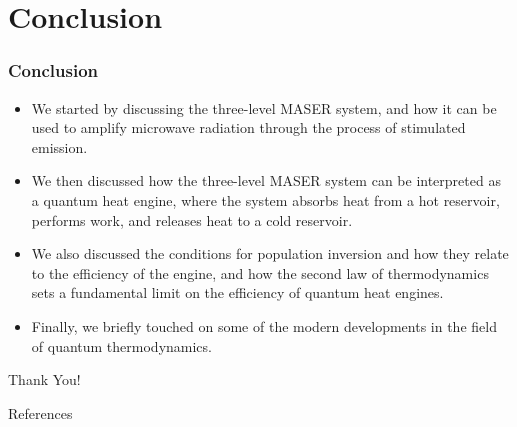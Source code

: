 \documentclass{beamer}
\begin{document}
    \section{Conclusion}
    \begin{frame}
        \frametitle{Conclusion}
        \begin{itemize}
            \item We started by discussing the three-level MASER system, and how it can be used to amplify microwave radiation through the process of stimulated emission. \pause 
            \item We then discussed how the three-level MASER system can be interpreted as a quantum heat engine, where the system absorbs heat from a hot reservoir, performs work, and releases heat to a cold reservoir. \pause
            \item We also discussed the conditions for population inversion and how they relate to the efficiency of the engine, and how the second law of thermodynamics sets a fundamental limit on the efficiency of quantum heat engines. \pause
            \item Finally, we briefly touched on some of the modern developments in the field of quantum thermodynamics.
        \end{itemize}
    \end{frame}


    \begingroup
        
        \begin{frame}{}
            \centering
            \begin{minipage}{\textwidth}
                \centering
                
                \Large Thank You! 
            \end{minipage}
        \end{frame}
    \endgroup
    
    \begin{frame}[allowframebreaks]{References}
        

        \nocite{*}



    \end{frame}
    \QApage
    
\end{document}
